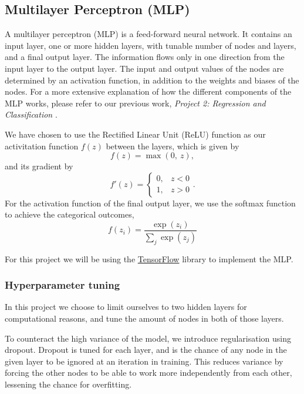 \documentclass[a4paper, 11pt, twocolumn]{article}
\begin{document}
\subsection{Multilayer Perceptron (MLP)}
A multilayer perceptron (MLP) is a feed-forward neural network. It contains an
input layer, one or more hidden layers, with tunable number of nodes and layers,
and a final output layer. The information flows only in one direction from the
input layer to the output layer. The input and output values of the nodes are
determined by an activation function, in addition to the weights and biases of
the nodes. For a more extensive explanation of how the different components of
the MLP works, please refer to our previous work, \textit{Project 2: Regression
and Classification} \cite{project2}.

We have chosen to use the Rectified Linear Unit (ReLU) function as our
activitation function $f(z)$ between the layers, which is given by
\begin{equation}
      f(z) = \max (0,\ z),
\end{equation}
and its gradient by
\begin{equation}
      f'(z) =
      \begin{cases}
            0, &  z<0\\
            1, &  z>0
      \end{cases}.
\end{equation}
For the activation function of the final output layer, we use the softmax
function to achieve the categorical outcomes,
\begin{equation}
      f(z_i)=\frac{\exp(z_i)}{\sum_j \exp(z_j)}
\end{equation}

For this project we will be using the \href{https://www.tensorflow.org/}
{TensorFlow} library to implement the MLP.

\subsubsection{Hyperparameter tuning}
In this project we choose to limit ourselves to two hidden layers for 
computational reasons, and tune the amount of nodes in both of those layers.

To counteract the high variance of the model, we introduce regularisation using 
dropout. Dropout is tuned for each layer, and is the chance of any node in the 
given layer to be ignored at an iteration in training. This reduces variance by 
forcing the other nodes to be able to work more independently from each other, 
lessening the chance for overfitting.
\end{document}
